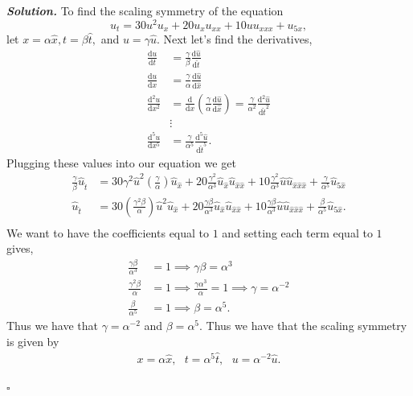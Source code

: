 \documentclass[12pt]{report}
\newenvironment{solution}[1][\it{Solution}]{\textbf{#1. } }{$\square$}
\newcommand{\paren}[1]{{\left(#1\right)}} %
\newcommand{\dd}[2]{\frac{\mathrm{d} #1}{\mathrm{d} #2}} %
\newcommand{\ddn}[3]{\frac{\mathrm{d}^{#1} #2}{\mathrm{d} #3^{#1}}} %
\begin{document}
\begin{solution}
    \noindent
    To find the scaling symmetry of the equation  
    \[
    u_t=30u^2 u_x+20u_x u_{xx}+10 u u_{xxx}+u_{5x},
    \]
    let $x = \alpha \hat{x}, t = \beta \hat{t},$ and $u = \gamma \hat{u}$. Next let's find the derivatives,
    \begin{align*}
        \dd{u}{t} &= \frac{\gamma}{\beta}\dd{\hat{u}}{\hat{t}}\\
        \dd{u}{x} &= \frac{\gamma}{\alpha}\dd{\hat{u}}{\hat{x}}\\
        \ddn{2}{u}{x} &= \dd{}{x}\paren{\frac{\gamma}{\alpha}\dd{\hat{u}}{\hat{x}}} = \frac{\gamma}{\alpha^2}\ddn{2}{\hat{u}}{\hat{t}}\\
        &\vdots\\
        \ddn{5}{u}{x} &= \frac{\gamma}{\alpha^5}\ddn{5}{\hat{u}}{\hat{t}}.
    \end{align*}
    Plugging these values into our equation we get
    \begin{align*}
        \frac{\gamma}{\beta} \hat{u}_{\hat{t}} &= 30 \gamma^2 \hat{u}^2\paren{\frac{\gamma}{\alpha}}\hat{u}_{\hat{x}} + 20 \frac{\gamma^2}{\alpha^3}\hat{u}_{\hat{x}}\hat{u}_{\hat{x}\hat{x}} + 10 \frac{\gamma^2}{\alpha^3}\hat{u}\hat{u}_{\hat{x}\hat{x}\hat{x}} + \frac{\gamma}{\alpha^5}\hat{u}_{5\hat{x}}\\
        \hat{u}_{\hat{t}} &= 30 \paren{\frac{\gamma^2\beta}{\alpha}} \hat{u}^2\hat{u}_{\hat{x}} + 20 \frac{\gamma\beta}{\alpha^3}\hat{u}_{\hat{x}}\hat{u}_{\hat{x}\hat{x}} + 10 \frac{\gamma\beta}{\alpha^3}\hat{u}\hat{u}_{\hat{x}\hat{x}\hat{x}} + \frac{\beta}{\alpha^5}\hat{u}_{5\hat{x}}.\\
    \end{align*}
    We want to have the coefficients equal to $1$ and setting each term equal to $1$ gives,
    \begin{align*}
        \frac{\gamma\beta}{\alpha^3} &= 1 \implies \gamma\beta = \alpha^3\\
        \frac{\gamma^2\beta}{\alpha} &= 1 \implies \frac{\gamma\alpha^3}{\alpha} = 1 \implies \gamma = \alpha^{-2}\\
        \frac{\beta}{\alpha^5} &= 1 \implies \beta = \alpha^5.
    \end{align*}
    Thus we have that $\gamma = \alpha^{-2}$ and $\beta = \alpha^5$. Thus we have that the scaling symmetry is given by
    \begin{align*}
        x = \alpha \hat{x}, ~~~ t = \alpha^5 \hat{t}, ~~~ u= \alpha^{-2}\hat{u}.
    \end{align*}





\end{solution}
\end{document}
